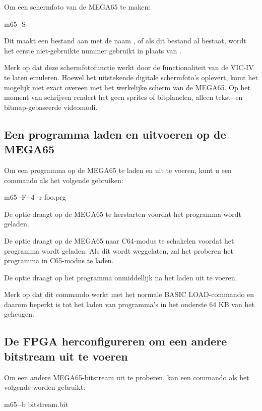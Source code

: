 Om een schermfoto van de MEGA65 te maken:

\begin{screencode}
m65 -S
\end{screencode}

Dit maakt een bestand aan met de naam ,
of als dit bestand al bestaat, wordt het eerste niet-gebruikte nummer gebruikt
in plaats van .

Merk op dat deze schermfotofunctie werkt door  de
functionaliteit van de VIC-IV te laten emuleren. Hoewel het uitstekende digitale schermfoto's oplevert, komt het mogelijk niet exact overeen met het werkelijke scherm van de
MEGA65. Op het moment van schrijven rendert het geen sprites of bitplanelen, alleen tekst- en bitmap-gebaseerde videomodi.

\subsection{Een programma laden en uitvoeren op de MEGA65}

Om een programma op de MEGA65 te laden en uit te voeren, kunt u een commando als het volgende gebruiken:

\begin{screencode}
m65 -F -4 -r foo.prg
\end{screencode}

De optie  draagt  op de MEGA65 te herstarten
voordat het programma wordt geladen.

De optie  draagt  op de MEGA65
naar C64-modus te schakelen voordat het programma wordt geladen. Als dit wordt weggelaten,
zal het proberen het programma in C65-modus te laden.

De optie  draagt  op het programma onmiddellijk
na het laden uit te voeren.

Merk op dat dit commando werkt met het normale BASIC LOAD-commando en
daarom beperkt is tot het laden van programma's in het onderste 64 KB van het geheugen.

\subsection{De FPGA herconfigureren om een andere bitstream uit te voeren}

Om een andere MEGA65-bitstream uit te proberen, kan een commando als het volgende worden
gebruikt:

\begin{screencode}
m65 -b bitstream.bit
\end{screencode}

